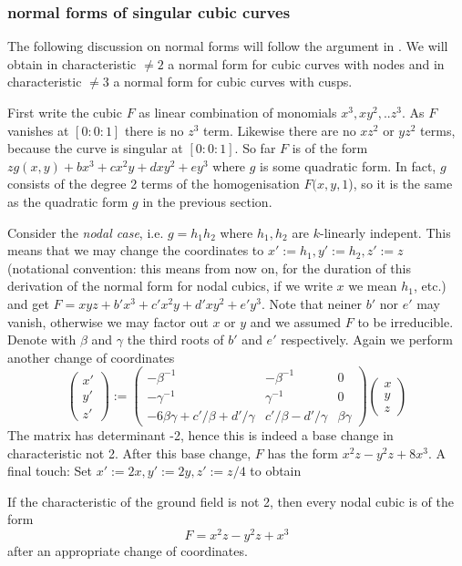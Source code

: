 \subsubsection{normal forms of singular cubic curves}

The following discussion on normal forms will follow the argument in \cite[Satz 4.9, p.102]{hulek2000elementare}.
We will obtain in characteristic $\neq 2$ a normal form for cubic curves with nodes and in characteristic $\neq 3$ a normal form for cubic curves with cusps.

First write the cubic $F$ as linear combination of monomials $x^3,xy^2,..z^3$.
As $F$ vanishes at $[0:0:1]$ there is no $z^3$ term.
Likewise there are no $xz^2$ or $yz^2$ terms, because the curve is singular at $[0:0:1]$.
So far $F$ is of the form $zg(x,y) + bx^3 + cx^2y + dxy^2 + ey^3$ where $g$ is some quadratic form.
In fact, $g$ consists of the degree 2 terms of the homogenisation $F(x,y,1$), so it is the same as the quadratic form $g$ in the previous section.

Consider the \emph{nodal case}, i.e. $g=h_1h_2$ where $h_1,h_2$ are $k$-linearly indepent.
This means that we may change the coordinates to $x':=h_1, y':=h_2, z':=z$ (notational convention: this means from now on, for the duration of this derivation of the normal form for nodal cubics, if we write $x$ we mean $h_1$, etc.) and get $F = xyz + b'x^3 + c'x^2y + d'xy^2 + e'y^3$.
Note that neiner $b'$ nor $e'$ may vanish, otherwise we may factor out $x$ or $y$ and we assumed $F$ to be irreducible.
Denote with $\beta$ and $\gamma$ the third roots of $b'$ and $e'$ respectively.
Again we perform another change of coordinates
\begin{equation}
\begin{pmatrix} x' \\ y' \\ z' \end{pmatrix}
:=
\begin{pmatrix}
-\beta^{-1} & -\beta^{-1} & 0 \\
-\gamma^{-1} & \gamma^{-1} & 0 \\
-6\beta\gamma + c'/\beta + d'/\gamma & c'/\beta - d'/\gamma & \beta\gamma
\end{pmatrix}
\begin{pmatrix} x \\ y \\ z \end{pmatrix}
\end{equation}
The matrix has determinant -2, hence this is indeed a base change in characteristic not 2.
After this base change, $F$ has the form $x^2z - y^2z +8x^3$.
A final touch: Set $x' := 2x, y':= 2y,z':=z/4$ to obtain
\begin{proposition} \label{propositionNormalformNodal}
If the characteristic of the ground field is not 2, then every nodal cubic is of the form
\begin{equation}
F = x^2z - y^2z +x^3
\end{equation}
after an appropriate change of coordinates.
\end{proposition}

